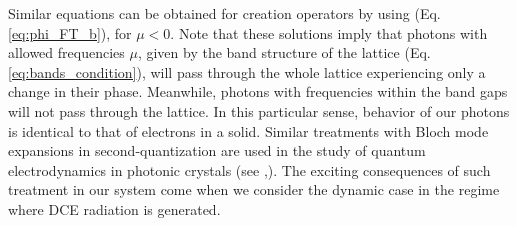 Similar equations can be obtained for creation operators by using (Eq. \ref{eq:phi_FT_b}), for $\mu<0$. Note that these solutions imply that photons with allowed frequencies $\mu$, given by the band structure of the lattice (Eq. \ref{eq:bands_condition}), will pass through the whole lattice experiencing only a change in their phase. Meanwhile, photons with frequencies within the band gaps will not pass through the lattice. In this particular sense, behavior of our photons is identical to that of electrons in a solid. Similar treatments with Bloch mode expansions in second-quantization are used in the study of quantum electrodynamics in photonic crystals (see \cite{Gainutdinov2018},\cite{Gainutdinov2021}). The exciting consequences of such treatment in our system come when we consider the dynamic case in the regime where DCE radiation is generated.





